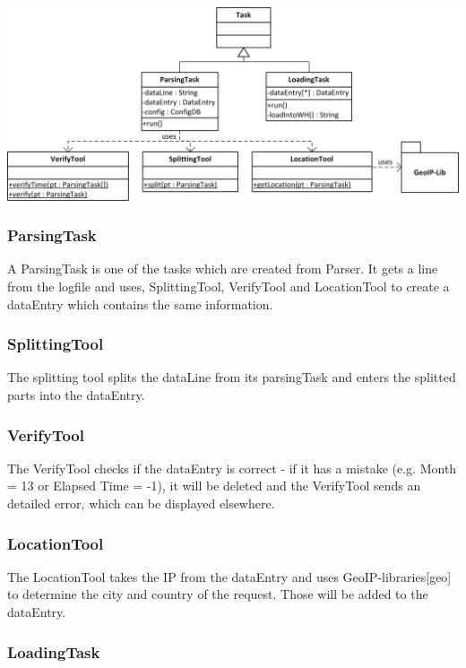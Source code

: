 \begin{center}
\includegraphics[width=1\linewidth]{Pictures/Parts/TaskTool.png}
\end{center}  

\subsubsection*{ParsingTask}
A ParsingTask is one of the tasks which are created from Parser. It gets a line from the logfile and uses, SplittingTool, VerifyTool
and LocationTool to create a dataEntry which contains the same information. 


\subsubsection*{SplittingTool}
The splitting tool splits the dataLine from its parsingTask and enters the splitted parts into the dataEntry.

\subsubsection*{VerifyTool}
The VerifyTool checks if the dataEntry is correct - if it has a mistake (e.g. Month = 13 or Elapsed Time = -1), it will 
be deleted and the VerifyTool sends an detailed error, which can be displayed elsewhere.

\subsubsection*{LocationTool}
The LocationTool takes the IP from the dataEntry and uses GeoIP-libraries[geo] to determine the city and country of the request.
Those will be added to the dataEntry.


\subsubsection*{LoadingTask}

